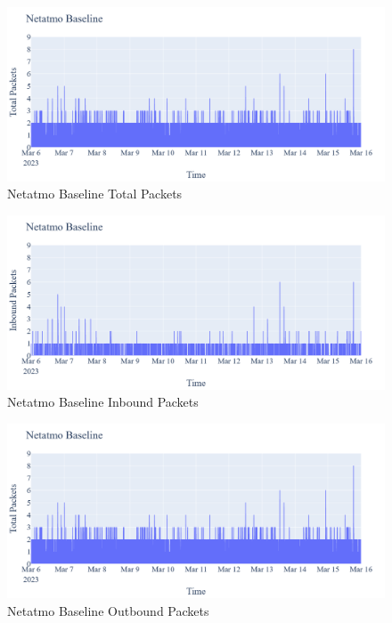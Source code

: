 \begin{figure} [!ht]         
    \includegraphics[scale=0.3]{figures/Netatmo_Baseline_TotalPackets.png}
    \caption{Netatmo Baseline Total Packets}
    \label{fig:NetatmoBaselineTotalPackets}
 \end{figure}

 \begin{figure} [!ht]         
    \includegraphics[scale=0.3]{figures/Netatmo_Baseline_InboundPackets.png}
    \caption{Netatmo Baseline Inbound Packets}
    \label{fig:NetatmoBaselineInboundPackets}
 \end{figure}

 \begin{figure} [!ht]         
    \includegraphics[scale=0.3]{figures/Netatmo_Baseline_TotalPackets.png}
    \caption{Netatmo Baseline Outbound Packets}
    \label{fig:NetatmoBaselineOutboundPackets}
 \end{figure}


